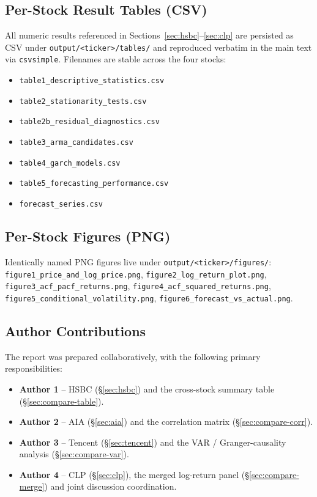 \documentclass[11pt,a4paper]{article}
\begin{document}
\subsection{Per-Stock Result Tables (CSV)}
All numeric results referenced in
Sections~\ref{sec:hsbc}--\ref{sec:clp} are persisted as CSV under
\texttt{output/<ticker>/tables/} and reproduced verbatim in the main
text via \texttt{csvsimple}.  Filenames are stable across the four
stocks:
\begin{itemize}[leftmargin=*]
  \item \texttt{table1\_descriptive\_statistics.csv}
  \item \texttt{table2\_stationarity\_tests.csv}
  \item \texttt{table2b\_residual\_diagnostics.csv}
  \item \texttt{table3\_arma\_candidates.csv}
  \item \texttt{table4\_garch\_models.csv}
  \item \texttt{table5\_forecasting\_performance.csv}
  \item \texttt{forecast\_series.csv}
\end{itemize}

\subsection{Per-Stock Figures (PNG)}
Identically named PNG figures live under
\texttt{output/<ticker>/figures/}: \texttt{figure1\_price\_and\_log\_price.png},
\texttt{figure2\_log\_return\_plot.png},
\texttt{figure3\_acf\_pacf\_returns.png},
\texttt{figure4\_acf\_squared\_returns.png},
\texttt{figure5\_conditional\_volatility.png},
\texttt{figure6\_forecast\_vs\_actual.png}.

\subsection{Author Contributions}
The report was prepared collaboratively, with the following primary
responsibilities:
\begin{itemize}[leftmargin=*]
  \item \textbf{Author 1} -- HSBC (\S\ref{sec:hsbc}) and the
        cross-stock summary table (\S\ref{sec:compare-table}).
  \item \textbf{Author 2} -- AIA (\S\ref{sec:aia}) and the
        correlation matrix (\S\ref{sec:compare-corr}).
  \item \textbf{Author 3} -- Tencent (\S\ref{sec:tencent}) and
        the VAR / Granger-causality analysis
        (\S\ref{sec:compare-var}).
  \item \textbf{Author 4} -- CLP (\S\ref{sec:clp}), the merged
        log-return panel (\S\ref{sec:compare-merge}) and joint
        discussion coordination.
\end{itemize}
\end{document}
